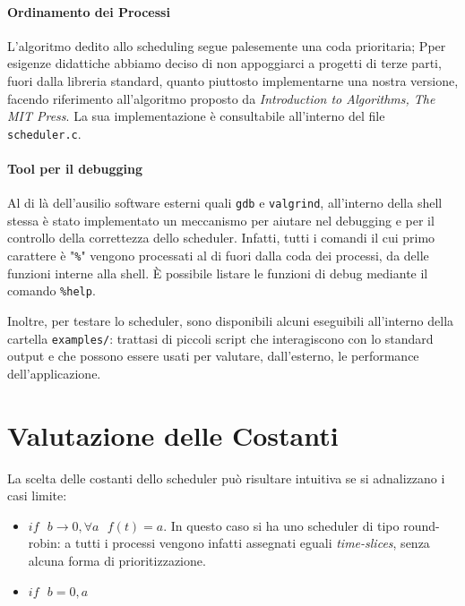 \documentclass[11pt]{article}
\begin{document}
\paragraph{Ordinamento dei Processi\\}
L'algoritmo dedito allo scheduling segue palesemente una coda prioritaria;
Pper esigenze didattiche abbiamo deciso di non appoggiarci a progetti di terze
parti, fuori dalla libreria standard, quanto piuttosto implementarne una nostra versione, facendo riferimento all'algoritmo proposto da \emph{Introduction to Algorithms, The MIT Press}. La sua implementazione \`e consultabile all'interno del file \texttt{scheduler.c}.

\paragraph{Tool per il debugging\\}
Al di l\`a dell'ausilio software esterni quali \texttt{gdb} e \texttt{valgrind}, all'interno della shell stessa \`e stato implementato un meccanismo per aiutare nel debugging e per il controllo della correttezza dello scheduler. Infatti, tutti i comandi il cui primo carattere \`e "\texttt{\%}" vengono processati al di fuori dalla coda dei processi, da delle funzioni interne alla shell. \`E possibile listare le funzioni di debug mediante il comando \texttt{\%help}.

Inoltre, per testare lo scheduler, sono disponibili alcuni eseguibili all'interno della cartella \texttt{examples/}: trattasi di piccoli script che interagiscono con lo standard output e che possono essere usati per valutare, dall'esterno, le performance dell'applicazione.


\section{Valutazione delle Costanti}

La scelta delle costanti dello scheduler pu\`o risultare intuitiva se si adnalizzano i casi limite: 
\begin{itemize}
\item $if \ \ \ b \rightarrow 0 , \forall a \ \ \ f(t) = a$. In questo caso si ha uno scheduler di tipo round-robin: a tutti i processi vengono infatti assegnati eguali \emph{time-slices}, senza alcuna forma di prioritizzazione.

\item $if \ \ \ b = 0, a $   
\end{itemize}
\end{document}
